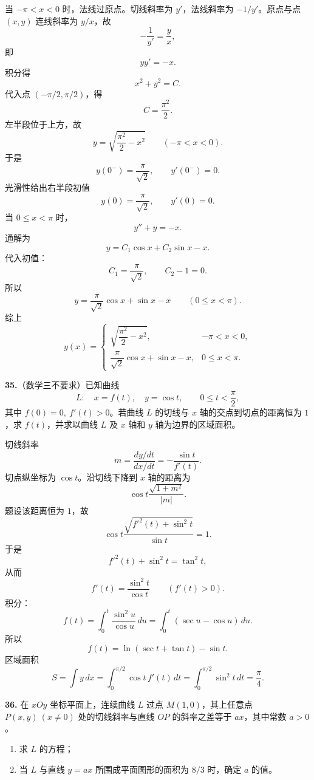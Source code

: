 \begin{solutionblock}
当 \(-\pi<x<0\) 时，法线过原点。切线斜率为 \(y'\)，法线斜率为 \(-1/y'\)。原点与点 \((x,y)\) 连线斜率为 \(y/x\)，故
\[
-\frac1{y'}=\frac{y}{x},
\]
即
\[
yy'=-x.
\]
积分得
\[
x^2+y^2=C.
\]
代入点 \((-\pi/2,\pi/2)\)，得
\[
C=\frac{\pi^2}{2}.
\]
左半段位于上方，故
\[
y=\sqrt{\frac{\pi^2}{2}-x^2}\qquad(-\pi<x<0).
\]
于是
\[
y(0^-)=\frac{\pi}{\sqrt2},\qquad y'(0^-)=0.
\]
光滑性给出右半段初值
\[
y(0)=\frac{\pi}{\sqrt2},\qquad y'(0)=0.
\]
当 \(0\le x<\pi\) 时，
\[
y''+y=-x.
\]
通解为
\[
y=C_1\cos x+C_2\sin x-x.
\]
代入初值：
\[
C_1=\frac{\pi}{\sqrt2},\qquad C_2-1=0.
\]
所以
\[
y=\frac{\pi}{\sqrt2}\cos x+\sin x-x\qquad(0\le x<\pi).
\]
综上
\[
\boxed{
y(x)=
\begin{cases}
\sqrt{\dfrac{\pi^2}{2}-x^2},&-\pi<x<0,\\[6pt]
\dfrac{\pi}{\sqrt2}\cos x+\sin x-x,&0\le x<\pi.
\end{cases}}
\]
\end{solutionblock}

\begin{problemblock}
\textbf{35.}（数学三不要求）已知曲线
\[
L:\quad x=f(t),\quad y=\cos t,\qquad 0\le t<\frac{\pi}{2},
\]
其中 \(f(0)=0,\ f'(t)>0\)。若曲线 \(L\) 的切线与 \(x\) 轴的交点到切点的距离恒为 \(1\)，求 \(f(t)\)，并求以曲线 \(L\) 及 \(x\) 轴和 \(y\) 轴为边界的区域面积。
\end{problemblock}

\begin{solutionblock}
切线斜率
\[
m=\frac{dy/dt}{dx/dt}=-\frac{\sin t}{f'(t)}.
\]
切点纵坐标为 \(\cos t\)。沿切线下降到 \(x\) 轴的距离为
\[
\cos t\frac{\sqrt{1+m^2}}{|m|}.
\]
题设该距离恒为 \(1\)，故
\[
\cos t\frac{\sqrt{f'^2(t)+\sin^2t}}{\sin t}=1.
\]
于是
\[
f'^2(t)+\sin^2t=\tan^2t,
\]
从而
\[
f'(t)=\frac{\sin^2t}{\cos t}\qquad(f'(t)>0).
\]
积分：
\[
f(t)=\int_0^t\frac{\sin^2u}{\cos u}\,du
=\int_0^t(\sec u-\cos u)\,du.
\]
所以
\[
\boxed{f(t)=\ln(\sec t+\tan t)-\sin t}.
\]
区域面积
\[
S=\int y\,dx
=\int_0^{\pi/2}\cos t\,f'(t)\,dt
=\int_0^{\pi/2}\sin^2t\,dt
=\boxed{\frac{\pi}{4}}.
\]
\end{solutionblock}

\begin{problemblock}
\textbf{36.} 在 \(xOy\) 坐标平面上，连续曲线 \(L\) 过点 \(M(1,0)\)，其上任意点 \(P(x,y)\ (x\ne0)\) 处的切线斜率与直线 \(OP\) 的斜率之差等于 \(ax\)，其中常数 \(a>0\)。
\begin{enumerate}
\item 求 \(L\) 的方程；
\item 当 \(L\) 与直线 \(y=ax\) 所围成平面图形的面积为 \(8/3\) 时，确定 \(a\) 的值。
\end{enumerate}
\end{problemblock}


